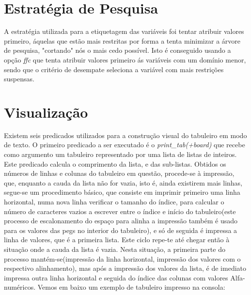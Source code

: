 \documentclass{llncs}
\begin{document}
\section{Estrat\'{e}gia de Pesquisa}

A estrat\'{e}gia utilizada para a etiquetagem das vari\'{a}veis foi tentar atribuir valores primeiro, \'{a}quelas que est\~{a}o mais restritas por forma a tenta minimizar a \'{a}rvore de pesquisa, "cortando" n\'{o}s o mais cedo poss\'{i}vel. Isto \'{e} conseguido usando a op\c{c}\~{a}o \emph{ffc} que tenta atribuir valores primeiro \'{a}s vari\'{a}veis com um dom\'{i}nio menor, sendo que o crit\'{e}rio de desempate seleciona a vari\'{a}vel com mais restri\c{c}\~{o}es suspensas.

\section{Visualiza\c{c}\~{a}o}



Existem seis predicados utilizados para a construção visual do tabuleiro em modo de texto. O primeiro predicado a ser executado é o \textit{print\_tab(+board)} que recebe como argumento um tabuleiro representado por uma lista de listas de inteiros. Este predicado calcula o comprimento da lista, e das sub-listas. Obtidos os números de linhas e colunas do tabuleiro em questão, procede-se à impressão, que, enquanto a cauda da lista não for vazia, isto é, ainda existirem mais linhas, segue-se um procedimento básico, que consiste em imprimir primeiro uma linha horizontal, numa nova linha verificar o tamanho do índice, para calcular o número de caracteres vazios a escrever entre o índice e início do tabuleiro(este processo de escalonamento do espaço para alinha a impressão também é usado para os valores das pegs no interior do tabuleiro), e só de seguida é impressa a linha de valores, que é a primeira lista. Este ciclo repe-te até chegar então à situação onde a cauda da lista é vazia. Nesta situação, a primeira parte do processo mantém-se(impressão da linha horizontal, impressão dos valores com o respectivo alinhamento), mas após a impressão dos valores da lista, é de imediato impressa outra linha horizontal e seguida do índice das colunas com valores Alfa-numéricos. 
Vemos em baixo um exemplo de tabuleiro impresso na consola:
\end{document}
